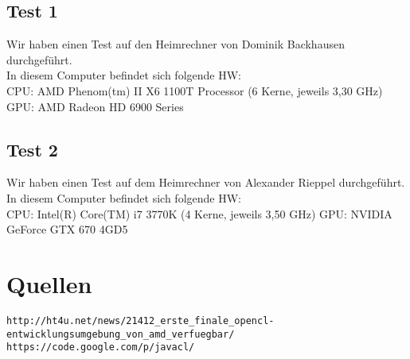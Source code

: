 \documentclass[a4paper,12pt]{scrreprt}
\begin{document}
\section{Test 1}
Wir haben einen Test auf den Heimrechner von Dominik Backhausen durchgeführt.\\
In diesem Computer befindet sich folgende HW:\\
CPU: AMD Phenom(tm) II X6 1100T Processor (6 Kerne, jeweils 3,30 GHz)
GPU: AMD Radeon HD 6900 Series



\section{Test 2}
Wir haben einen Test auf dem Heimrechner von Alexander Rieppel durchgeführt.\\
In diesem Computer befindet sich folgende HW:\\
CPU: Intel(R) Core(TM) i7 3770K (4 Kerne, jeweils 3,50 GHz)
GPU: NVIDIA GeForce GTX 670 4GD5




\chapter{Quellen}

\nolinkurl{http://ht4u.net/news/21412_erste_finale_opencl-entwicklungsumgebung_von_amd_verfuegbar/}\\
\nolinkurl{https://code.google.com/p/javacl/}

	
\end{document}

